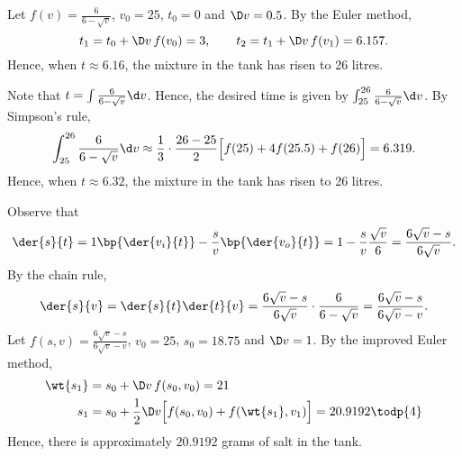 \begin{solution}
\begin{ppart}
        \begin{psubpart}
            Let $f(v) = \frac{6}{6 - \sqrt v}$, $v_0 = 25$, $t_0 = 0$ and $\D v = 0.5$. By the Euler method, \[t_1 = t_0 + \D v \, f(v_0) = 3, \qquad t_2 = t_1 + \D v \, f(v_1) = 6.157.\] Hence, when $t \approx 6.16$, the mixture in the tank has risen to 26 litres.
        \end{psubpart}
        \begin{psubpart}
            Note that $t = \int \frac{6}{6 - \sqrt v} \d v$. Hence, the desired time is given by $\int_{25}^{26} \frac{6}{6 - \sqrt v} \d v$. By Simpson's rule, \[\int_{25}^{26} \frac{6}{6 - \sqrt v} \d v \approx \frac13 \cdot \frac{26-25}{2} \Big[f(25) + 4f(25.5) + f(26)\Big] = 6.319.\] Hence, when $t \approx 6.32$, the mixture in the tank has risen to 26 litres.
        \end{psubpart}
    \end{ppart}
    \begin{ppart}
        Observe that \[\der{s}{t} = 1 \bp{\der{v_i}{t}} - \frac{s}{v} \bp{\der{v_o}{t}} = 1 - \frac{s}{v} \frac{\sqrt{v}}6 = \frac{6\sqrt v - s}{6\sqrt v}.\] By the chain rule, \[\der{s}{v} = \der{s}{t} \der{t}{v} = \frac{6\sqrt v - s}{6\sqrt v} \cdot \frac{6}{6 - \sqrt v} = \frac{6\sqrt v - s}{6\sqrt v - v}.\] Let $f(s, v) = \frac{6\sqrt v - s}{6\sqrt v - v}$, $v_0 = 25$, $s_0 = 18.75$ and $\D v = 1$. By the improved Euler method,
        \begin{align*}
            \wt{s_1} &= s_0 + \D v \, f(s_0, v_0) = 21\\
            s_1 &= s_0 + \frac12 \D v \Big[f(s_0, v_0) + f(\wt{s_1}, v_1)\Big] = 20.9192 \todp{4}
        \end{align*}
        Hence, there is approximately $20.9192$ grams of salt in the tank.
    \end{ppart}
\end{solution}

